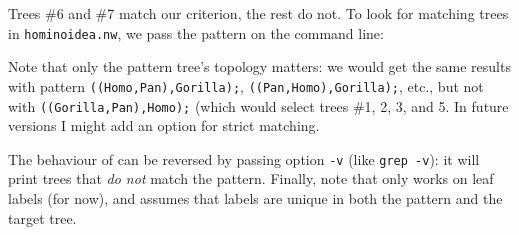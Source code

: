 \noindent{}Trees \#6 and \#7 match our criterion, the rest do not. To look for matching trees in \texttt{hominoidea.nw}, we pass the pattern on the command line:




\noindent{}Note that only the pattern tree's topology matters: we would get the
same results with pattern \texttt{((Homo,Pan),Gorilla);},
\texttt{((Pan,Homo),Gorilla);}, etc., but not with
\texttt{((Gorilla,Pan),Homo);} (which would select trees \#1, 2, 3, and 5. In
future versions I might add an option for strict matching.

The behaviour of \match{} can be reversed by passing option \texttt{-v} (like
\texttt{grep -v}): it will print trees that \emph{do not} match the pattern.
Finally, note that \match{} only works on leaf labels (for now), and assumes
that labels are unique in both the pattern and the target tree.
